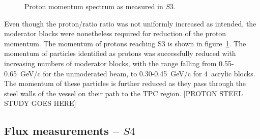 	\begin{figure}[ht]
		\centering
		\begin{adjustbox}{max totalsize={0.8\textwidth}, center}
			
		\end{adjustbox}
		\caption{Proton momentum spectrum as measured in $S3$.}
		\label{fig:s3promom}
	\end{figure}

	Even though the proton/ratio ratio was not uniformly increased as intended, the moderator blocks were nonetheless required for reduction of the proton momentum.
	The momentum of protons reaching S3 is shown in figure~\ref{fig:s3promom}. 
	The momentum of particles identified as protons was successfully reduced with increasing numbers of moderator blocks, with the range falling from 0.55-0.65~GeV/c for the unmoderated beam, to 0.30-0.45~GeV/c for 4~acrylic blocks.
    The momentum of these particles is further reduced as they pass through the steel walls of the vessel on their path to the TPC region.
    [PROTON STEEL STUDY GOES HERE]


	\subsection{Flux measurements -- $S4$}

   
